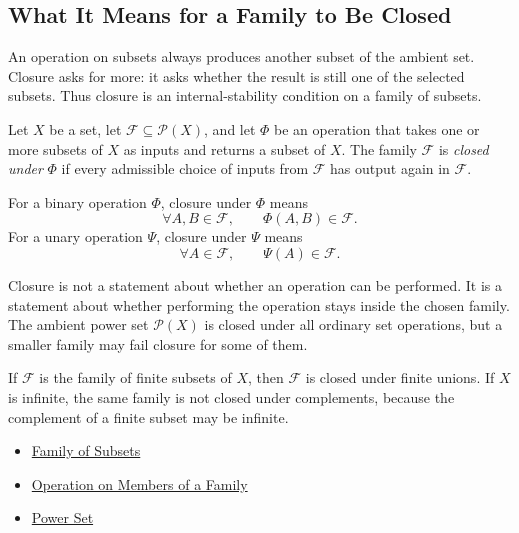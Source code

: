 \subsection{What It Means for a Family to Be Closed}

\begin{remark*}[Exposition]
An operation on subsets always produces another subset of the ambient set.
Closure asks for more: it asks whether the result is still one of the selected
subsets.  Thus closure is an internal-stability condition on a family of
subsets.
\end{remark*}

\begin{definition}\label{def:closed-under-operation}
Let \(X\) be a set, let \(\mathcal{F}\subseteq\mathcal{P}(X)\), and let
\(\Phi\) be an operation that takes one or more subsets of \(X\) as inputs and
returns a subset of \(X\).  The family \(\mathcal{F}\) is \emph{closed under}
\(\Phi\) if every admissible choice of inputs from \(\mathcal{F}\) has output
again in \(\mathcal{F}\).
\end{definition}

\begin{remark*}
For a binary operation \(\Phi\), closure under \(\Phi\) means
\[
  \forall A,B\in\mathcal{F},\qquad
  \Phi(A,B)\in\mathcal{F}.
\]
For a unary operation \(\Psi\), closure under \(\Psi\) means
\[
  \forall A\in\mathcal{F},\qquad
  \Psi(A)\in\mathcal{F}.
\]
\end{remark*}

\begin{remark*}[Interpretation]
Closure is not a statement about whether an operation can be performed.  It is
a statement about whether performing the operation stays inside the chosen
family.  The ambient power set \(\mathcal{P}(X)\) is closed under all ordinary
set operations, but a smaller family may fail closure for some of them.
\end{remark*}

\begin{remark*}[Examples]
If \(\mathcal{F}\) is the family of finite subsets of \(X\), then
\(\mathcal{F}\) is closed under finite unions.  If \(X\) is infinite, the same
family is not closed under complements, because the complement of a finite
subset may be infinite.
\end{remark*}

\begin{dependencies}
\begin{itemize}
  \item \hyperref[def:family-of-subsets]{Family of Subsets}
  \item \hyperref[def:operation-on-members-of-family]{Operation on Members of a Family}
  \item \hyperref[def:power-set]{Power Set}
\end{itemize}
\end{dependencies}
